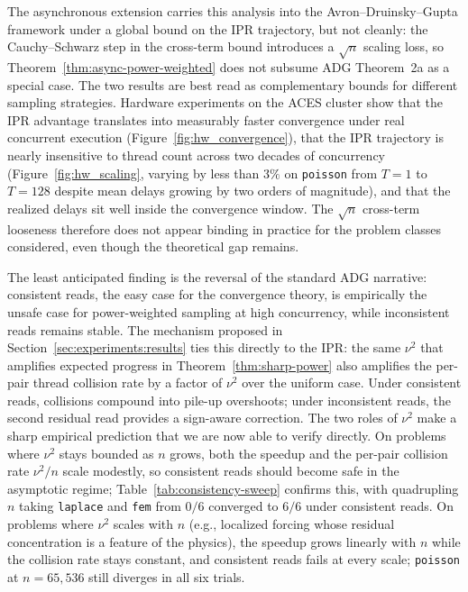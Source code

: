 \documentclass[pdflatex,sn-mathphys-num]{sn-jnl}%
\theoremstyle{thmstyleone}%
\theoremstyle{thmstyletwo}%
\theoremstyle{thmstylethree}%
\begin{document}
The asynchronous extension carries this analysis into the
Avron--Druinsky--Gupta framework under a global bound on the IPR
trajectory, but not cleanly: the Cauchy--Schwarz step in the cross-term
bound introduces a $\sqrt{n}$ scaling loss, so
Theorem~\ref{thm:async-power-weighted} does not subsume ADG Theorem~2a as
a special case. The two results are best read as complementary bounds
for different sampling strategies. Hardware experiments on the ACES
cluster show that the IPR advantage translates into measurably faster
convergence under real concurrent execution
(Figure~\ref{fig:hw_convergence}), that the IPR trajectory is nearly
insensitive to thread count across two decades of concurrency
(Figure~\ref{fig:hw_scaling}, varying by less than $3\%$ on
\texttt{poisson} from $T=1$ to $T=128$ despite mean delays growing by two
orders of magnitude), and that the realized delays sit well inside the
convergence window. The $\sqrt{n}$ cross-term looseness therefore does
not appear binding in practice for the problem classes considered, even
though the theoretical gap remains.

The least anticipated finding is the reversal of the standard ADG
narrative: consistent reads, the easy case for the convergence theory,
is empirically the unsafe case for power-weighted sampling at high
concurrency, while inconsistent reads remains stable. The mechanism
proposed in Section~\ref{sec:experiments:results} ties this directly to
the IPR: the same $\nu^2$ that amplifies expected progress in
Theorem~\ref{thm:sharp-power} also amplifies the per-pair thread
collision rate by a factor of $\nu^2$ over the uniform case. Under
consistent reads, collisions compound into pile-up overshoots; under
inconsistent reads, the second residual read provides a sign-aware
correction. The two roles of $\nu^2$ make a sharp empirical prediction
that we are now able to verify directly. On problems where $\nu^2$ stays
bounded as $n$ grows, both the speedup and the per-pair collision rate
$\nu^2/n$ scale modestly, so consistent reads should become safe in the
asymptotic regime; Table~\ref{tab:consistency-sweep} confirms this,
with quadrupling $n$ taking \texttt{laplace} and \texttt{fem} from
$0/6$ converged to $6/6$ under consistent reads. On problems where
$\nu^2$ scales with $n$ (e.g., localized forcing whose residual
concentration is a feature of the physics), the speedup grows linearly
with $n$ while the collision rate stays constant, and consistent reads
fails at every scale; \texttt{poisson} at $n = 65{,}536$ still diverges
in all six trials.
\end{document}
